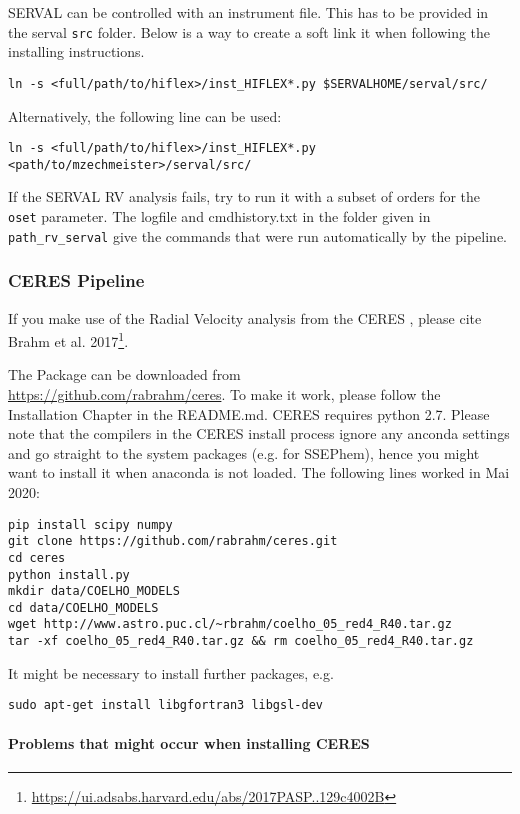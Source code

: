 \documentclass[10pt,a4paper]{article}
\begin{document}
SERVAL can be controlled with an instrument file. This has to be provided in the serval \verb|src| folder. Below is a way to create a soft link it when following the installing instructions.
\begin{lstlisting}[style=base]
ln -s <full/path/to/hiflex>/inst_HIFLEX*.py $SERVALHOME/serval/src/
\end{lstlisting}
Alternatively, the following line can be used:
\begin{lstlisting}[style=base]
ln -s <full/path/to/hiflex>/inst_HIFLEX*.py <path/to/mzechmeister>/serval/src/
\end{lstlisting}

If the SERVAL RV analysis fails, try to run it with a subset of orders for the \verb|oset| parameter. The logfile and cmdhistory.txt in the folder given in \verb|path_rv_serval| give the commands that were run automatically by the pipeline.

\subsubsection{CERES Pipeline}
\label{Section:Explanation_CERES_pipeline}
If you make use of the Radial Velocity analysis from the CERES , please cite Brahm et al. 2017\footnote{\url{https://ui.adsabs.harvard.edu/abs/2017PASP..129c4002B}}.

The Package can be downloaded from\\ \url{https://github.com/rabrahm/ceres}. To make it work, please follow the Installation Chapter in the README.md. CERES requires python 2.7. Please note that the compilers in the CERES install process ignore any anconda settings and go straight to the system packages (e.g. for SSEPhem), hence you might want to install it when anaconda is not loaded. The following lines worked in Mai 2020:
\begin{lstlisting}[style=base]
pip install scipy numpy
git clone https://github.com/rabrahm/ceres.git
cd ceres
python install.py
mkdir data/COELHO_MODELS
cd data/COELHO_MODELS
wget http://www.astro.puc.cl/~rbrahm/coelho_05_red4_R40.tar.gz
tar -xf coelho_05_red4_R40.tar.gz && rm coelho_05_red4_R40.tar.gz
\end{lstlisting}

It might be necessary to install further packages, e.g.
\begin{lstlisting}[style=base]
sudo apt-get install libgfortran3 libgsl-dev
\end{lstlisting}


\paragraph{Problems that might occur when installing CERES\\}
\end{document}
